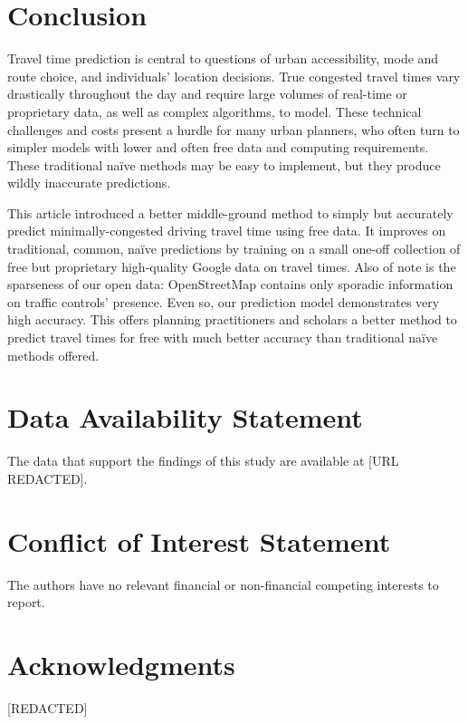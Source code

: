 \documentclass[12pt,letterpaper]{article} %
\begin{document}
\section{Conclusion}

Travel time prediction is central to questions of urban accessibility, mode and route choice, and individuals' location decisions. True congested travel times vary drastically throughout the day and require large volumes of real-time or proprietary data, as well as complex algorithms, to model. These technical challenges and costs present a hurdle for many urban planners, who often turn to simpler models with lower and often free data and computing requirements. These traditional naïve methods may be easy to implement, but they produce wildly inaccurate predictions.

This article introduced a better middle-ground method to simply but accurately predict minimally-congested driving travel time using free data. It improves on traditional, common, naïve predictions by training on a small one-off collection of free but proprietary high-quality Google data on travel times. Also of note is the sparseness of our open data: OpenStreetMap contains only sporadic information on traffic controls' presence. Even so, our prediction model demonstrates very high accuracy. This offers planning practitioners and scholars a better method to predict travel times for free with much better accuracy than traditional naïve methods offered.

\section*{Data Availability Statement}

The data that support the findings of this study are available at [URL REDACTED].

\section*{Conflict of Interest Statement}

The authors have no relevant financial or non-financial competing interests to report.

\section*{Acknowledgments}

[REDACTED]


\setlength{\bibsep}{0.00cm plus 0.05cm} %


\end{document}
